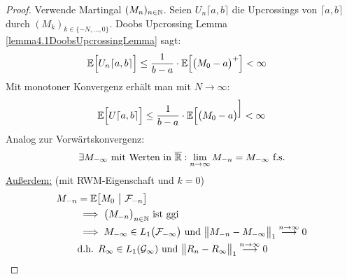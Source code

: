 \begin{proof}
Verwende Martingal $(M_n)_{n\in\mathbb{N}}$. Seien $U_n\lceil a,b\rceil$ die Upcrossings von $\lceil a,b\rceil$ durch $(M_k)_{k\in\lbrace-N,\ldots,0\rbrace}$. Doobs Upcrossing Lemma \ref{lemma4.1DoobsUpcrossingLemma} sagt:
\begin{align*}
\mathbb{E}\Big[U_n\lceil a,b\rceil\Big]
&\leq
\frac{1}{b-a}\cdot\mathbb{E}\Big[\big(M_0-a\big)^+\Big]<\infty
\end{align*}
Mit monotoner Konvergenz erhält man mit $N\to\infty$:
\begin{align*}
\mathbb{E}\Big[U\lceil a,b\rceil\Big]\leq\frac{1}{b-a}\cdot\mathbb{E}\Big[\big(M_0-a\big)^\Big]<\infty
\end{align*}
Analog zur Vorwärtskonvergenz:
\begin{align*}
\exists M_{-\infty}\text{ mit Werten in }\overline{\mathbb{R}}:\lim\limits_{n\to\infty} M_{-n}=M_{-\infty}\text{ f.s.}
\end{align*}
\ul{Außerdem:} (mit RWM-Eigenschaft und $k=0$)
\begin{align*}
M_{-n}
&=\mathbb{E}\big[M_0~\big|~\mathcal{F}_{-n}\big]\\
&\implies \big(M_{-n}\big)_{n\in\mathbb{N}}\text{ ist ggi}\\
&\implies M_{-\infty}\in L_1\big(\mathcal{F}_{-\infty}\big)\text{ und }\big\Vert M_{-n}-M_{-\infty}\big\Vert_1\stackrel{n\to\infty}{\longrightarrow}0\\
&\text{d.h. }R_\infty\in L_1(\mathcal{G}_\infty)\text{ und }\big\Vert R_n-R_\infty\big\Vert_1\stackrel{n\to\infty}{\longrightarrow}0
\end{align*}
\end{proof}

